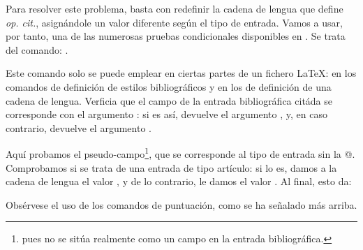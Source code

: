 Para resolver este problema, basta con redefinir la cadena de lengua que define \emph{op. cit.}, asignándole un valor diferente según el tipo de entrada.  Vamos a usar, por tanto, una de las numerosas pruebas condicionales disponibles en . 
Se trata del comando: .

Este comando solo se puede emplear en ciertas partes de un fichero \LaTeX: en los comandos de definición de estilos bibliográficos y en los de definición de una cadena de lengua. 
Verficia que el campo   de la entrada bibliográfica citáda se corresponde con el argumento  : si es así, devuelve el argumento , y, en caso contrario, devuelve el argumento  .

Aquí probamos el pseudo-campo\footnote{ pues no se sitúa realmente como un campo en la entrada bibliográfica.}, que se corresponde al tipo de entrada sin la @. Comprobamos si se trata de una entrada de tipo artículo: si lo es, damos a la cadena de lengua el valor ,  y de lo contrario, le damos el valor .
Al final, esto da: 

\begin{latexcode}
\end{latexcode}

Obsérvese el uso de los comandos de puntuación, como se ha señalado más arriba.



    
